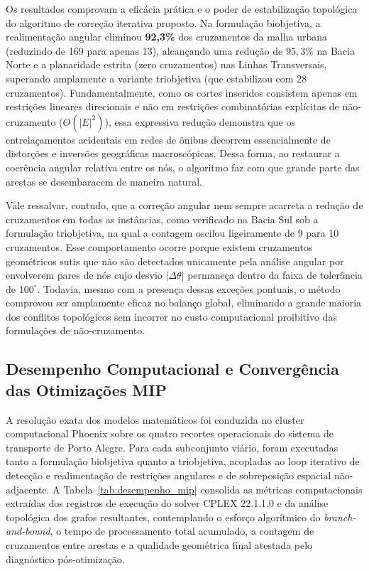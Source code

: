 \documentclass[cic,tc]{infufrgs}
\begin{document}
Os resultados comprovam a eficácia prática e o poder de estabilização topológica do algoritmo de correção iterativa proposto. Na formulação biobjetiva, a realimentação angular eliminou \textbf{92,3\%} dos cruzamentos da malha urbana (reduzindo de 169 para apenas 13), alcançando uma redução de $95{,}3\%$ na Bacia Norte e a planaridade estrita (zero cruzamentos) nas Linhas Transversais, superando amplamente a variante triobjetiva (que estabilizou com 28 cruzamentos). Fundamentalmente, como os cortes inseridos consistem apenas em restrições lineares direcionais e não em restrições combinatórias explícitas de não-cruzamento ($O(|E|^2)$), essa expressiva redução demonstra que os entrelaçamentos acidentais em redes de ônibus decorrem essencialmente de distorções e inversões geográficas macroscópicas. Dessa forma, ao restaurar a coerência angular relativa entre os nós, o algoritmo faz com que grande parte das arestas se desembaracem de maneira natural.

Vale ressalvar, contudo, que a correção angular nem sempre acarreta a redução de cruzamentos em todas as instâncias, como verificado na Bacia Sul sob a formulação triobjetiva, na qual a contagem oscilou ligeiramente de 9 para 10 cruzamentos. Esse comportamento ocorre porque existem cruzamentos geométricos sutis que não são detectados unicamente pela análise angular por envolverem pares de nós cujo desvio $|\Delta\theta|$ permaneça dentro da faixa de tolerância de $100^\circ$. Todavia, mesmo com a presença dessas exceções pontuais, o método comprovou ser amplamente eficaz no balanço global, eliminando a grande maioria dos conflitos topológicos sem incorrer no custo computacional proibitivo das formulações de não-cruzamento.

\subsection{Desempenho Computacional e Convergência das Otimizações MIP}
\label{subsec:desempenho_computacional_mip}

A resolução exata dos modelos matemáticos foi conduzida no cluster computacional Phoenix sobre os quatro recortes operacionais do sistema de transporte de Porto Alegre. Para cada subconjunto viário, foram executadas tanto a formulação biobjetiva quanto a triobjetiva, acopladas ao loop iterativo de detecção e realimentação de restrições angulares e de sobreposição espacial não-adjacente. A Tabela~\ref{tab:desempenho_mip} consolida as métricas computacionais extraídas dos registros de execução do solver CPLEX 22.1.1.0 e da análise topológica dos grafos resultantes, contemplando o esforço algorítmico do \textit{branch-and-bound}, o tempo de processamento total acumulado, a contagem de cruzamentos entre arestas e a qualidade geométrica final atestada pelo diagnóstico pós-otimização.
\end{document}

